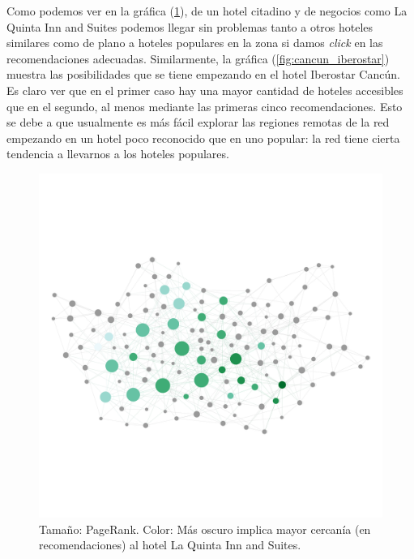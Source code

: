 \documentclass[12pt]{report}
\begin{document}
Como podemos ver en la gráfica (\ref{fig:cancun_laquinta}), de un hotel citadino y de negocios como La Quinta Inn and Suites podemos llegar sin problemas tanto a otros hoteles similares como de plano a hoteles populares en la zona si damos \emph{click} en las recomendaciones adecuadas. Similarmente, la gráfica (\ref{fig:cancun_iberostar}) muestra las posibilidades que se tiene empezando en el hotel Iberostar Cancún. Es claro ver que en el primer caso hay una mayor cantidad de hoteles accesibles que en el segundo, al menos mediante las primeras cinco recomendaciones. Esto se debe a que usualmente es más fácil explorar las regiones remotas de la red empezando en un hotel poco reconocido que en uno popular: la red tiene cierta tendencia a llevarnos a los hoteles populares.
\begin{figure}[ht]
	\centering
	\includegraphics[height=0.75\textwidth, angle=90,
		trim = 100 900 100 900, clip]{imagenes/cancun_laquinta2.png}
	\caption{\label{fig:cancun_laquinta} Tamaño: PageRank. Color: Más oscuro implica mayor cercanía (en recomendaciones) al hotel La Quinta Inn and Suites.}
\end{figure}
\end{document}
